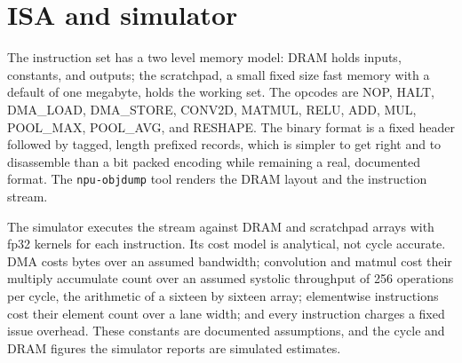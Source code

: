 \section{ISA and simulator}

The instruction set has a two level memory model: DRAM holds inputs, constants,
and outputs; the scratchpad, a small fixed size fast memory with a default of one
megabyte, holds the working set. The opcodes are NOP, HALT, DMA\_LOAD, DMA\_STORE,
CONV2D, MATMUL, RELU, ADD, MUL, POOL\_MAX, POOL\_AVG, and RESHAPE. The binary
format is a fixed header followed by tagged, length prefixed records, which is
simpler to get right and to disassemble than a bit packed encoding while remaining
a real, documented format. The \texttt{npu-objdump} tool renders the DRAM layout
and the instruction stream.

The simulator executes the stream against DRAM and scratchpad arrays with fp32
kernels for each instruction. Its cost model is analytical, not cycle accurate.
DMA costs bytes over an assumed bandwidth; convolution and matmul cost their
multiply accumulate count over an assumed systolic throughput of 256 operations
per cycle, the arithmetic of a sixteen by sixteen array; elementwise instructions
cost their element count over a lane width; and every instruction charges a fixed
issue overhead. These constants are documented assumptions, and the cycle and DRAM
figures the simulator reports are simulated estimates.
